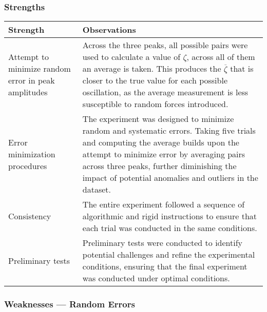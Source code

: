 \documentclass[a4paper,12pt]{article}
\newcommand{\thcolor}{\cellcolor{Blue!25}}
\begin{document}
\subsubsection{Strengths}

\begin{center}
  \begin{tabular}{|p{}|p{}|}
    \hline
    \thcolor Strength                                   & \thcolor Observations                                                                                                                                                                                                                                                                                          \\ \hline
    Attempt to minimize random error in peak amplitudes & Across the three peaks, all possible pairs were used to calculate a value of $\zeta$, across all of them an average is taken. This produces the $\overline{\zeta}$ that is closer to the true value for each possible oscillation, as the average measurement is less susceptible to random forces introduced. \\ \hline
    Error minimization procedures                       & The experiment was designed to minimize random and systematic errors. Taking five trials and computing the average builds upon the attempt to minimize error by averaging pairs across three peaks, further diminishing the impact of potential anomalies and outliers in the dataset.                         \\ \hline
    Consistency                                         & The entire experiment followed a sequence of algorithmic and rigid instructions to ensure that each trial was conducted in the same conditions.                                                                                                                                                                \\ \hline
    Preliminary tests                                   & Preliminary tests were conducted to identify potential challenges and refine the experimental conditions, ensuring that the final experiment was conducted under optimal conditions.                                                                                                                           \\ \hline
  \end{tabular}
\end{center}

\subsubsection{Weaknesses --- Random Errors}
\end{document}
